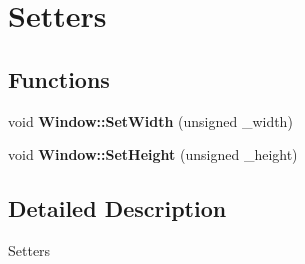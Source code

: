 \hypertarget{group___setters}{}\section{Setters}
\label{group___setters}
\subsection*{Functions}
\begin{DoxyCompactItemize}
\item 
\mbox{\label{group___setters_ga2fba7009a94faaef315b90509124a65c}} 
void {\bfseries Window\+::\+Set\+Width} (unsigned \+\_\+width)
\item 
\mbox{\label{group___setters_ga28843b64d34ec006f51274e154a81f00}} 
void {\bfseries Window\+::\+Set\+Height} (unsigned \+\_\+height)
\end{DoxyCompactItemize}


\subsection{Detailed Description}
Setters 